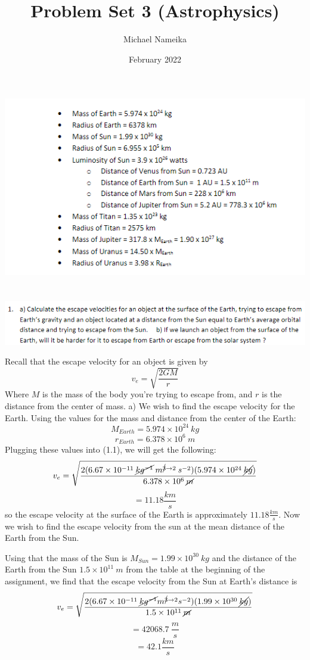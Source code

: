 \documentclass{article}
\title{Problem Set 3 (Astrophysics)}
\author{Michael Nameika}
\date{February 2022}
\begin{document}
\maketitle
\includegraphics[scale = 0.8]{probset3data.PNG}
\section{}
\includegraphics[scale = 0.8]{probset3num1.PNG}

Recall that the escape velocity for an object is given by 
\begin{equation}
    v_e = \sqrt{\frac{2GM}{r}}
\end{equation}
Where $M$ is the mass of the body you're trying to escape from, and $r$ is the distance from the center of mass. 
a) We wish to find the escape velocity for the Earth. Using the values for the mass and distance from the center of the Earth:
\[M_{Earth} = 5.974 \times 10^{24} \: kg\]
\[r_{Earth} = 6.378 \times 10^6 \: m\]
Plugging these values into (1.1), we will get the following:
\[v_e = \sqrt{\frac{2(6.67 \times 10^{-11} \: \cancel{kg^{-1}} \: m^{\cancel{3} \to 2} \: s^{-2})(5.974 \times 10^{24} \: \cancel{kg})}{6.378 \times 10^6 \:\cancel{m}}}\]
\[ = 11.18 \frac{km}{s}\]
so the escape velocity at the surface of the Earth is approximately $11.18 \frac{km}{s}$. Now we wish to find the escape velocity from the sun at the mean distance of the Earth from the Sun.

Using that the mass of the Sun is $M_{Sun} = 1.99 \times 10^{30} \: kg$ and the distance of the Earth from the Sun $1.5 \times 10^{11} \: m$ from the table at the beginning of the assignment, we find that the escape velocity from the Sun at Earth's distance is
\[v_e = \sqrt{\frac{2(6.67 \times 10^{-11} \: \cancel{kg^{-1}}m^{\cancel{3} \to 2}s^{-2})(1.99 \times 10^{30} \: \cancel{kg})}{1.5 \times 10^{11} \: \cancel{m}}}\]
\[ = 42068.7 \: \frac{m}{s}\]
\[ = 42.1 \frac{km}{s}\]
\end{document}
